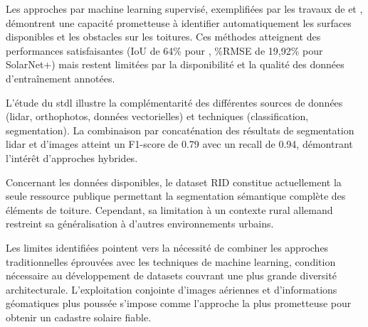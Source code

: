 \par{Les approches par machine learning supervisé, exemplifiées par les travaux de \citeauthor{castello_quantification_2021} et \citeauthor{li_deep_2024}, démontrent une capacité prometteuse à identifier automatiquement les surfaces disponibles et les obstacles sur les toitures. Ces méthodes atteignent des performances satisfaisantes (IoU de 64\% pour \citeauthor{castello_quantification_2021}, \%RMSE de 19,92\% pour SolarNet+) mais restent limitées par la disponibilité et la qualité des données d'entraînement annotées.}

\par{L'étude du \acrshort{stdl} illustre la complémentarité des différentes sources de données (\gls{lidar}, orthophotos, données vectorielles) et techniques (classification, segmentation). La combinaison par concaténation des résultats de segmentation \gls{lidar} et d'images atteint un F1-score de 0.79 avec un recall de 0.94, démontrant l'intérêt d'approches hybrides.}

\par{Concernant les données disponibles, le dataset RID constitue actuellement la seule ressource publique permettant la segmentation sémantique complète des éléments de toiture. Cependant, sa limitation à un contexte rural allemand restreint sa généralisation à d'autres environnements urbains.}

\par{Les limites identifiées pointent vers la nécessité de combiner les approches traditionnelles éprouvées avec les techniques de machine learning, condition nécessaire au développement de datasets couvrant une plus grande diversité architecturale. L'exploitation conjointe d'images aériennes et d'informations géomatiques plus poussée s'impose comme l'approche la plus prometteuse pour obtenir un cadastre solaire fiable.}